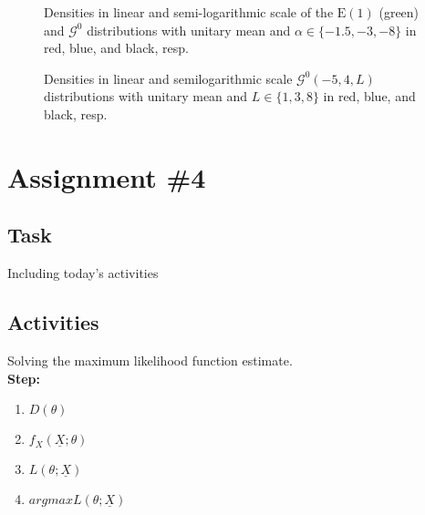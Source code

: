 \documentclass{article}
\begin{document}
\begin{figure}[hbt]
\centering
{}
\caption[Densities in linear and semi-logarithmic scale of the $\text{E}(1)$ (green) and $\mathcal G^0$ distributions with unitary mean]{Densities in linear and semi-logarithmic scale of the $\text{E}(1)$ (green) and $\mathcal G^0$ distributions with unitary mean and $\alpha\in\{-1.5,-3,-8\}$ in red, blue, and black, resp.}
\end{figure}
\begin{figure}[hbt]
\centering
{}
\caption[Densities in linear and semilogarithmic scale $\mathcal G^0(-5,4,L)$ distributions with unitary mean and $L\in\{1,3,8\}$]{Densities in linear and semilogarithmic scale $\mathcal G^0(-5,4,L)$ distributions with unitary mean and $L\in\{1,3,8\}$ in red, blue, and black, resp.}
\end{figure}


\section*{Assignment \#4}
\subsection*{Task}
Including today's activities
\subsection*{Activities}
Solving the maximum likelihood function estimate. \\
\textbf{Step:} \\
\begin{enumerate}
	\item $D(\theta)$
	\item $f_X(\underline{X};\theta)$
	\item $L(\theta;\underline{X})$
	\item $argmax L(\theta;\underline{X})$
\end{enumerate}
\end{document}
